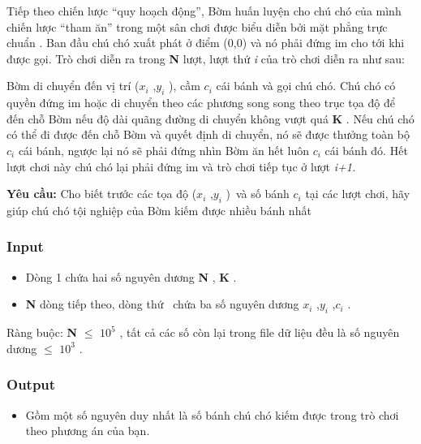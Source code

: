 



   Tiếp theo chiến lược “quy hoạch động”, Bờm huấn luyện cho chú chó của mình chiến lược “tham ăn” trong một sân chơi được biểu diễn bởi mặt phẳng trực chuẩn                                                   . Ban đầu chú chó xuất phát ở điểm (0,0) và nó phải đứng im cho tới khi được gọi. Trò chơi diễn ra trong   \textbf{    N   }   lượt, lượt thứ   \emph{    i   }   của trò chơi diễn ra như sau:  

   Bờm di chuyển đến vị trí ($x_{i}$   ,$y_{i}$   ), cầm $c_{i}$   cái bánh và gọi chú chó. Chú chó có quyền đứng im hoặc di chuyển theo các phương song song theo trục tọa độ để đến chỗ Bờm nếu độ dài quãng đường di chuyển không vượt quá   \textbf{    K   }   . Nếu chú chó có thể đi được đến chỗ Bờm và quyết định di chuyển, nó sẽ được thưởng toàn bộ $c_{i}$   cái bánh, ngược lại nó sẽ phải đứng nhìn Bờm ăn hết luôn $c_{i}$   cái bánh đó. Hết lượt chơi này chú chó lại phải đứng im và trò chơi tiếp tục ở lượt   \emph{    i+1.   }

\textbf{    Yêu cầu:   }   Cho biết trước các tọa độ ($x_{i}$   ,$y_{i}$   ) và số bánh $c_{i}$   tại các lượt chơi, hãy giúp chú chó tội nghiệp của Bờm kiếm được nhiều bánh nhất  

\subsubsection{   Input  }
\begin{itemize}
	\item     Dòng 1 chứa hai số nguyên dương    \textbf{     N    }    ,    \textbf{     K    }    .   
	\item \textbf{     N    }    dòng tiếp theo, dòng thứ     chứa ba số nguyên dương $x_{i}$    ,$y_{i}$    ,$c_{i}$    .   
\end{itemize}

   Ràng buộc:   \textbf{    N   }    $\le$ $10^{5}$   , tất cả các số còn lại trong file dữ liệu đều là số nguyên dương  $\le$ $10^{3}$   .  

\subsubsection{   Output  }
\begin{itemize}
	\item     Gồm một số nguyên duy nhất là số bánh chú chó kiếm được trong trò chơi theo phương án của bạn.   
\end{itemize}


